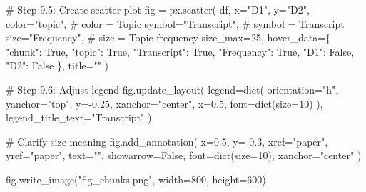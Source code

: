 \documentclass[
  letterpaper,
  DIV=11,
  numbers=noendperiod]{scrartcl}
\newenvironment{Shaded}{\begin{snugshade}}{\end{snugshade}}
\newcommand{\BuiltInTok}[1]{\textcolor[rgb]{0.00,0.23,0.31}{#1}}
\newcommand{\CommentTok}[1]{\textcolor[rgb]{0.37,0.37,0.37}{#1}}
\newcommand{\DecValTok}[1]{\textcolor[rgb]{0.68,0.00,0.00}{#1}}
\newcommand{\FloatTok}[1]{\textcolor[rgb]{0.68,0.00,0.00}{#1}}
\newcommand{\NormalTok}[1]{\textcolor[rgb]{0.00,0.23,0.31}{#1}}
\newcommand{\OperatorTok}[1]{\textcolor[rgb]{0.37,0.37,0.37}{#1}}
\newcommand{\StringTok}[1]{\textcolor[rgb]{0.13,0.47,0.30}{#1}}
\newcommand{\VariableTok}[1]{\textcolor[rgb]{0.07,0.07,0.07}{#1}}
\begin{document}
\begin{Shaded}
\begin{Highlighting}[]
\CommentTok{\# Step 9.5: Create scatter plot}
\NormalTok{fig }\OperatorTok{=}\NormalTok{ px.scatter(}
\NormalTok{    df,}
\NormalTok{    x}\OperatorTok{=}\StringTok{"D1"}\NormalTok{,}
\NormalTok{    y}\OperatorTok{=}\StringTok{"D2"}\NormalTok{,}
\NormalTok{    color}\OperatorTok{=}\StringTok{"topic"}\NormalTok{,        }\CommentTok{\# color = Topic}
\NormalTok{    symbol}\OperatorTok{=}\StringTok{"Transcript"}\NormalTok{,  }\CommentTok{\# symbol = Transcript}
\NormalTok{    size}\OperatorTok{=}\StringTok{"Frequency"}\NormalTok{,     }\CommentTok{\# size = Topic frequency}
\NormalTok{    size\_max}\OperatorTok{=}\DecValTok{25}\NormalTok{,}
\NormalTok{    hover\_data}\OperatorTok{=}\NormalTok{\{}
        \StringTok{"chunk"}\NormalTok{: }\VariableTok{True}\NormalTok{,}
        \StringTok{"topic"}\NormalTok{: }\VariableTok{True}\NormalTok{,}
        \StringTok{"Transcript"}\NormalTok{: }\VariableTok{True}\NormalTok{,}
        \StringTok{"Frequency"}\NormalTok{: }\VariableTok{True}\NormalTok{,}
        \StringTok{"D1"}\NormalTok{: }\VariableTok{False}\NormalTok{,}
        \StringTok{"D2"}\NormalTok{: }\VariableTok{False}
\NormalTok{    \},}
\NormalTok{    title}\OperatorTok{=}\StringTok{""}
\NormalTok{)}

\CommentTok{\# Step 9.6: Adjust legend}
\NormalTok{fig.update\_layout(}
\NormalTok{    legend}\OperatorTok{=}\BuiltInTok{dict}\NormalTok{(}
\NormalTok{        orientation}\OperatorTok{=}\StringTok{"h"}\NormalTok{,}
\NormalTok{        yanchor}\OperatorTok{=}\StringTok{"top"}\NormalTok{,}
\NormalTok{        y}\OperatorTok{={-}}\FloatTok{0.25}\NormalTok{,}
\NormalTok{        xanchor}\OperatorTok{=}\StringTok{"center"}\NormalTok{,}
\NormalTok{        x}\OperatorTok{=}\FloatTok{0.5}\NormalTok{,}
\NormalTok{        font}\OperatorTok{=}\BuiltInTok{dict}\NormalTok{(size}\OperatorTok{=}\DecValTok{10}\NormalTok{)}
\NormalTok{    ),}
\NormalTok{    legend\_title\_text}\OperatorTok{=}\StringTok{"Transcript"}
\NormalTok{)}

\CommentTok{\# Clarify size meaning}
\NormalTok{fig.add\_annotation(}
\NormalTok{    x}\OperatorTok{=}\FloatTok{0.5}\NormalTok{,}
\NormalTok{    y}\OperatorTok{={-}}\FloatTok{0.3}\NormalTok{,}
\NormalTok{    xref}\OperatorTok{=}\StringTok{"paper"}\NormalTok{,}
\NormalTok{    yref}\OperatorTok{=}\StringTok{"paper"}\NormalTok{,}
\NormalTok{    text}\OperatorTok{=}\StringTok{""}\NormalTok{,}
\NormalTok{    showarrow}\OperatorTok{=}\VariableTok{False}\NormalTok{,}
\NormalTok{    font}\OperatorTok{=}\BuiltInTok{dict}\NormalTok{(size}\OperatorTok{=}\DecValTok{10}\NormalTok{),}
\NormalTok{    xanchor}\OperatorTok{=}\StringTok{"center"}
\NormalTok{)}

\NormalTok{fig.write\_image(}\StringTok{"fig\_chunks.png"}\NormalTok{, width}\OperatorTok{=}\DecValTok{800}\NormalTok{, height}\OperatorTok{=}\DecValTok{600}\NormalTok{)}
\end{Highlighting}
\end{Shaded}
\end{document}
